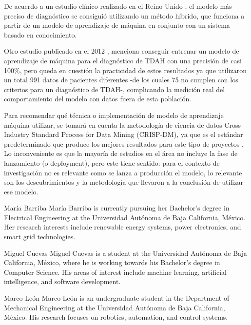 \documentclass[10pt,journal,compsoc]{IEEEtran}
\begin{document}
De acuerdo a un estudio clínico realizado en el Reino Unido \cite{chen-2023}, el modelo más preciso de diagnóstico se consiguió utilizando un método híbrido, que funciona a partir de un modelo de aprendizaje de máquina en conjunto con un sistema basado en conocimiento.

Otro estudio publicado en el 2012 \cite{wall-2012}, menciona conseguir entrenar un modelo de aprendizaje de máquina para el diagnóstico de TDAH con una precisión de casi 100\%, pero queda en cuestión la practicidad de estos resultados ya que utilizaron un total 991 datos de pacientes diferentes -de los cuales 75 no cumplen con los criterios para un diagnóstico de TDAH-, complicando la medición real del comportamiento del modelo con datos fuera de esta población.

Para recomendar qué técnica o implementación de modelo de aprendizaje máquina utilizar, se tomará en cuenta la metodología de ciencia de datos Cross-Industry Standard Process for Data Mining (CRISP-DM), ya que es el estándar predeterminado que produce los mejores resultados para este tipo de proyectos \cite{schroer-2021}. Lo inconveniente es que la mayoría de estudios en el área no incluye la fase de lanzamiento (o deployment), pero este tiene sentido: para el contexto de investigación no es relevante como se lanza a producción el modelo, lo relevante son los descubrimientos y la metodología que llevaron a la conclusión de utilizar ese modelo.

\printbibliography

\begin{IEEEbiography}{María Barriba}
    María Barriba is currently pursuing her Bachelor's degree in Electrical Engineering at the Universidad Autónoma de Baja California, México. Her research interests include renewable energy systems, power electronics, and smart grid technologies.
\end{IEEEbiography}

\begin{IEEEbiography}{Miguel Cuevas}
    Miguel Cuevas is a student at the Universidad Autónoma de Baja California, México, where he is working towards his Bachelor's degree in Computer Science. His areas of interest include machine learning, artificial intelligence, and software development.
\end{IEEEbiography}

\begin{IEEEbiography}{Marco León}
    Marco León is an undergraduate student in the Department of Mechanical Engineering at the Universidad Autónoma de Baja California, México. His research focuses on robotics, automation, and control systems.
\end{IEEEbiography}
\end{document}
